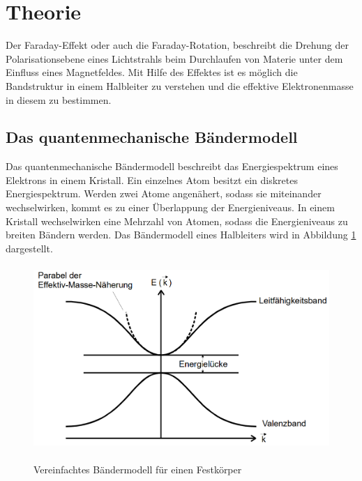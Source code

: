\section{Theorie}
Der Faraday-Effekt oder auch die Faraday-Rotation, beschreibt die Drehung der
Polarisationsebene eines Lichtstrahls beim Durchlaufen von Materie unter dem
Einfluss eines Magnetfeldes. Mit Hilfe des Effektes ist es möglich die
Bandstruktur in einem Halbleiter zu verstehen und die effektive Elektronenmasse
in diesem zu bestimmen.

\subsection{Das quantenmechanische Bändermodell}
Das quantenmechanische Bändermodell beschreibt das Energiespektrum eines
Elektrons in einem Kristall. Ein einzelnes Atom besitzt ein diskretes
Energiespektrum. Werden zwei Atome angenähert, sodass sie miteinander
wechselwirken, kommt es zu einer Überlappung der Energieniveaus. In einem
Kristall wechselwirken eine Mehrzahl von Atomen, sodass die Energieniveaus zu
breiten Bändern werden. Das Bändermodell eines Halbleiters wird in Abbildung
\ref{fig:band} dargestellt.

\begin{figure}[H]
  \centering
  \includegraphics[width=13cm, height=7cm]{bandmodel.png}
  \caption{Vereinfachtes Bändermodell für einen Festkörper}
  \label{fig:band}
  \cite{skript}
\end{figure}

